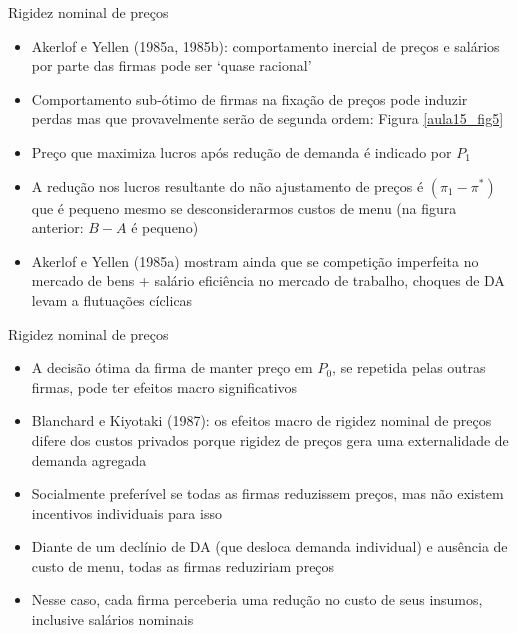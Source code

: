 \documentclass[10pt]{beamer}
\begin{document}
\begin{frame}{Rigidez nominal de preços}
    \begin{itemize}
        \item Akerlof e Yellen (1985a, 1985b): comportamento inercial de preços e salários por parte das firmas pode ser `quase racional'\bigskip
        \item Comportamento sub-ótimo de firmas na fixação de preços pode induzir perdas mas que provavelmente serão de segunda ordem: Figura \ref{aula15_fig5}\bigskip
        \item Preço que maximiza lucros após redução de demanda é indicado por $P_1$\bigskip
        \item A redução nos lucros resultante do não ajustamento de preços é $(\pi_1 - \pi^*)$ que é pequeno mesmo se desconsiderarmos custos de menu (na figura anterior: $B - A$ é pequeno)\bigskip
        \item Akerlof e Yellen (1985a) mostram ainda que se competição imperfeita no mercado de bens + salário eficiência no mercado de trabalho, choques de DA levam a flutuações cíclicas
    \end{itemize}
\end{frame}

\begin{frame}{Rigidez nominal de preços}
    \begin{itemize}
        \item A decisão ótima da firma de manter preço em $P_0$, se repetida pelas outras firmas, pode ter efeitos macro significativos\bigskip
        \item Blanchard e Kiyotaki (1987): os efeitos macro de rigidez nominal de preços difere dos custos privados porque rigidez de preços gera uma externalidade de demanda agregada\bigskip
        \item Socialmente preferível se todas as firmas reduzissem preços, mas não existem incentivos individuais para isso\bigskip
        \item Diante de um declínio de DA (que desloca demanda individual) e ausência de custo de menu, todas as firmas reduziriam preços\bigskip
        \item Nesse caso, cada firma perceberia uma redução no custo de seus insumos, inclusive salários nominais
    \end{itemize}
\end{frame}
\end{document}
